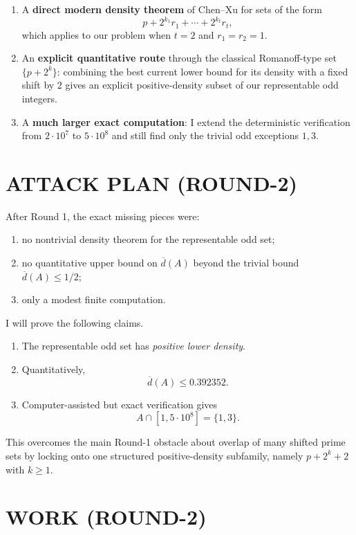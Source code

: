 \begin{enumerate}
\item A \textbf{direct modern density theorem} of Chen--Xu for sets of the form
\[
p+2^{k_1}r_1+\cdots+2^{k_t}r_t,
\]
which applies to our problem when $t=2$ and $r_1=r_2=1$.

\item An \textbf{explicit quantitative route} through the classical Romanoff-type set $\{p+2^k\}$: combining the best current lower bound for its density with a fixed shift by $2$ gives an explicit positive-density subset of our representable odd integers.

\item A \textbf{much larger exact computation}: I extend the deterministic verification from $2\cdot 10^7$ to $5\cdot 10^8$ and still find only the trivial odd exceptions $1,3$.
\end{enumerate}

\section{ATTACK PLAN (ROUND-2)}

After Round 1, the exact missing pieces were:

\begin{enumerate}
\item no nontrivial density theorem for the representable odd set;
\item no quantitative upper bound on $\overline d(A)$ beyond the trivial bound $\overline d(A)\le 1/2$;
\item only a modest finite computation.
\end{enumerate}

I will prove the following claims.

\begin{enumerate}
\item The representable odd set has \emph{positive lower density}.
\item Quantitatively,
\[
\overline d(A)\le 0.392352.
\]
\item Computer-assisted but exact verification gives
\[
A\cap[1,5\cdot 10^8]=\{1,3\}.
\]
\end{enumerate}

This overcomes the main Round-1 obstacle about overlap of many shifted prime sets by locking onto one structured positive-density subfamily, namely $p+2^k+2$ with $k\ge 1$.

\section{WORK (ROUND-2)}

